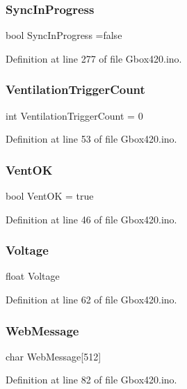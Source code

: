 \subsubsection{\texorpdfstring{SyncInProgress}{SyncInProgress}}
{\footnotesize\ttfamily bool Sync\+In\+Progress =false}



Definition at line 277 of file Gbox420.\+ino.

\mbox{\label{_gbox420_8ino_af34c955917c73c1bb835d6e5832bd303}} 
\subsubsection{\texorpdfstring{VentilationTriggerCount}{VentilationTriggerCount}}
{\footnotesize\ttfamily int Ventilation\+Trigger\+Count = 0}



Definition at line 53 of file Gbox420.\+ino.

\mbox{\label{_gbox420_8ino_af1217617c3ddf0f97e8551cc10a1dbc2}} 
\subsubsection{\texorpdfstring{VentOK}{VentOK}}
{\footnotesize\ttfamily bool Vent\+OK = true}



Definition at line 46 of file Gbox420.\+ino.

\mbox{\label{_gbox420_8ino_a3ed583f6febf5e0b8e9d3dc196a87085}} 
\subsubsection{\texorpdfstring{Voltage}{Voltage}}
{\footnotesize\ttfamily float Voltage}



Definition at line 62 of file Gbox420.\+ino.

\mbox{\label{_gbox420_8ino_a55de604f183fd5f0fceb767aabe9efce}} 
\subsubsection{\texorpdfstring{WebMessage}{WebMessage}}
{\footnotesize\ttfamily char Web\+Message\mbox{[}512\mbox{]}}



Definition at line 82 of file Gbox420.\+ino.

